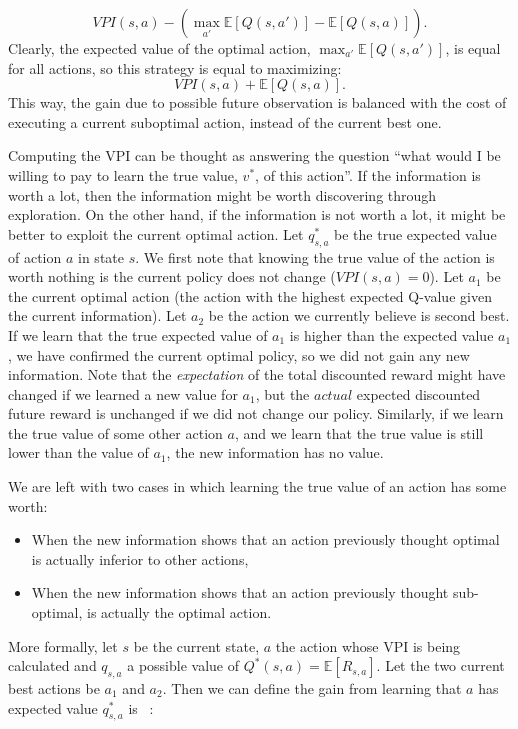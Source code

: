 \begin{equation}
	VPI(s,a)- (\max_{a'} \mathbb{E}[Q(s,a')]- \mathbb{E}[Q(s,a)]).
\end{equation} 
Clearly, the expected value of the optimal action, $\max_{a'} \mathbb{E}[Q(s,a')]$, is equal for all actions, so this strategy is equal to maximizing:
\begin{equation}
	VPI(s,a)+ \mathbb{E}[Q(s,a)].
\end{equation}
This way, the gain due to possible future observation is balanced with the cost of executing a current suboptimal action, instead of the current best one.\par
Computing the VPI can be thought as answering the question ``what would I be willing to pay to learn the true value, $v^*$, of this action''. If the information is worth a lot, then the information might be worth discovering through exploration. On the other hand, if the information is not worth a lot, it might be better to exploit the current optimal action. Let $q^*_{s,a}$ be the true expected value of action $a$ in state $s$. We first note that knowing the true value of the action is worth nothing is the current policy does not change ($VPI(s,a)=0$). Let $a_1$ be the current optimal action (\ie the action with the highest expected Q-value given the current information). Let $a_2$ be the action we currently believe is second best. If we learn that the true expected value of $a_1$ is higher than the expected value $a_1$, we have confirmed the current optimal policy, so we did not gain any new information. Note that the \emph{expectation} of the total discounted reward might have changed if we learned a new value for $a_1$, but the $actual$ expected discounted future reward is unchanged if we did not change our policy.  Similarly, if we learn the true value of some other action $a$, and we learn that the true value is still lower than the value of $a_1$, the new information has no value. \par 
We are left with two cases in which learning the true value of an action has some worth:
\begin{itemize}
\item When the new information shows that an action previously thought optimal is actually inferior to other actions,
\item When the new information shows that an action previously thought sub-optimal, is actually the optimal action.
\end{itemize} 
More formally, let $s$ be the current state, $a$ the action whose VPI is being calculated and $q_{s,a}$ a possible value of $Q^*(s,a)=\mathbb{E}[R_{s,a}]$. Let the two current best actions be $a_1$ and $a_2$. Then we can define the gain from learning that $a$ has expected value $q^*_{s,a}$ is ~\cite{Dearden98bayesianq-learning}:

